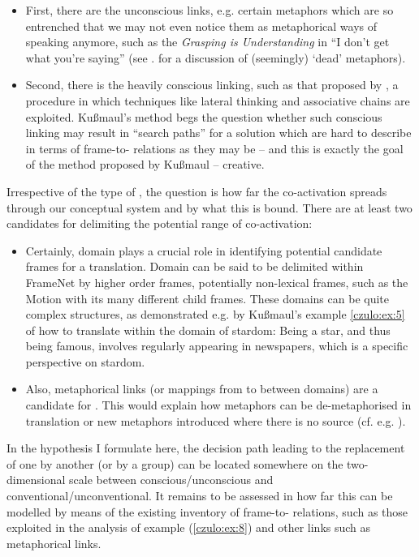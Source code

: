 \documentclass[output=paper]{LSP/langsci}
\begin{document}
\begin{itemize}
\item First, there are the unconscious links, e.g. certain metaphors which are so entrenched that we may not even notice them as metaphorical ways of speaking anymore, such as the \textit{Grasping is Understanding}  in ``I don't get what you're saying'' (see \citealt[124ff]{Lakoff1999}. for a discussion of (seemingly) `dead' metaphors). 
\item Second, there is the heavily conscious linking, such as that proposed by \citet{Kussmaul2000}, a procedure in which techniques like lateral thinking and associative chains are exploited. Kußmaul's method begs the question whether such conscious linking may result in ``search paths'' for a solution which are hard to describe in terms of frame-to- relations as they may be -- and this is exactly the goal of the method proposed by Kußmaul -- creative.
\end{itemize}

Irrespective of the type of , the question is how far the co-activa\-tion spreads through our conceptual system and by what this  is bound. There are at least two candidates for delimiting the potential range of co-ac\-ti\-va\-tion:

\begin{itemize}
\item Certainly, domain plays a crucial role in identifying potential candidate frames for a translation. Domain can be said to be delimited within Frame\-Net by higher order frames, potentially non-lexical frames, such as the Motion  with its many different child frames. These domains can be quite complex structures, as demonstrated e.g. by Kußmaul's example \ref{czulo:ex:5} of how to translate within the domain of stardom: Being a star, and thus being famous, involves regularly appearing in newspapers, which is a specific perspective on stardom.
\item Also, metaphorical links (or mappings from  to  between domains) are a candidate for  . This would explain how metaphors can be de-metaphorised in translation or new metaphors introduced where there is no source  (cf. e.g. \citealt{Toury1995,Samaniego2013}).
\end{itemize}

In the   hypothesis I formulate here, the decision path leading to the replacement of one  by another (or by a  group) can be located somewhere on the two-dimensional scale between conscious/unconscious and conventional/unconventional. It remains to be assessed in how far this can be modelled by means of the existing inventory of frame-to- relations, such as those exploited in the analysis of example (\ref{czulo:ex:8}) and other links such as metaphorical links.
\end{document}
